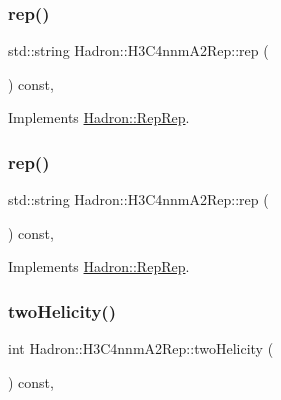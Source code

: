 \subsubsection{\texorpdfstring{rep()}{rep()}\hspace{0.1cm}{\footnotesize\ttfamily [4/5]}}
{\footnotesize\ttfamily std\+::string Hadron\+::\+H3\+C4nnm\+A2\+Rep\+::rep (\begin{DoxyParamCaption}{ }\end{DoxyParamCaption}) const\hspace{0.3cm}{\ttfamily [inline]}, {\ttfamily [virtual]}}



Implements \mbox{\hyperlink{structHadron_1_1RepRep_ab3213025f6de249f7095892109575fde}{Hadron\+::\+Rep\+Rep}}.

\mbox{\label{structHadron_1_1H3C4nnmA2Rep_a2e3cc9bd16d8097b2b57f500b0d82be1}} 
\subsubsection{\texorpdfstring{rep()}{rep()}\hspace{0.1cm}{\footnotesize\ttfamily [5/5]}}
{\footnotesize\ttfamily std\+::string Hadron\+::\+H3\+C4nnm\+A2\+Rep\+::rep (\begin{DoxyParamCaption}{ }\end{DoxyParamCaption}) const\hspace{0.3cm}{\ttfamily [inline]}, {\ttfamily [virtual]}}



Implements \mbox{\hyperlink{structHadron_1_1RepRep_ab3213025f6de249f7095892109575fde}{Hadron\+::\+Rep\+Rep}}.

\mbox{\label{structHadron_1_1H3C4nnmA2Rep_aeeec45fb753cc4ac9b6de1d24a868ab9}} 
\subsubsection{\texorpdfstring{twoHelicity()}{twoHelicity()}\hspace{0.1cm}{\footnotesize\ttfamily [1/3]}}
{\footnotesize\ttfamily int Hadron\+::\+H3\+C4nnm\+A2\+Rep\+::two\+Helicity (\begin{DoxyParamCaption}{ }\end{DoxyParamCaption}) const\hspace{0.3cm}{\ttfamily [inline]}, {\ttfamily [virtual]}}

